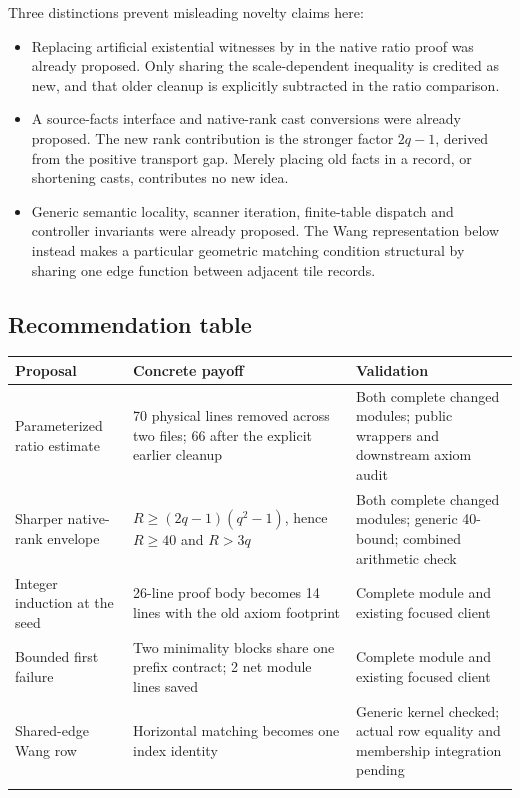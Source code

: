\documentclass[11pt,a4paper]{article}
\newcommand{\code}[1]{\texttt{\detokenize{#1}}}
\begin{document}
Three distinctions prevent misleading novelty claims here:
\begin{itemize}
\item Replacing artificial existential witnesses by \code{set} in the native ratio proof was already proposed. Only sharing the scale-dependent inequality is credited as new, and that older cleanup is explicitly subtracted in the ratio comparison.
\item A source-facts interface and native-rank cast conversions were already proposed. The new rank contribution is the stronger factor $2q-1$, derived from the positive transport gap. Merely placing old facts in a record, or shortening casts, contributes no new idea.
\item Generic semantic locality, scanner iteration, finite-table dispatch and controller invariants were already proposed. The Wang representation below instead makes a particular geometric matching condition structural by sharing one edge function between adjacent tile records.
\end{itemize}

\subsection{Recommendation table}

\begin{tabularx}{\textwidth}{@{}L{.21\textwidth}YL{.28\textwidth}@{}}
\toprule
\textbf{Proposal} & \textbf{Concrete payoff} & \textbf{Validation}\\
\midrule
Parameterized ratio estimate & 70 physical lines removed across two files; 66 after the explicit earlier \code{set} cleanup & Both complete changed modules; public wrappers and downstream axiom audit\\
\addlinespace[3pt]
Sharper native-rank envelope & $R\ge(2q-1)(q^2-1)$, hence $R\ge40$ and $R>3q$ & Both complete changed modules; generic 40-bound; combined arithmetic check\\
\addlinespace[3pt]
Integer induction at the seed & 26-line proof body becomes 14 lines with the old axiom footprint & Complete module and existing focused client\\
\addlinespace[3pt]
Bounded first failure & Two minimality blocks share one prefix contract; 2 net module lines saved & Complete module and existing focused client\\
\addlinespace[3pt]
Shared-edge Wang row & Horizontal matching becomes one index identity & Generic kernel checked; actual row equality and membership integration pending\\
\addlinespace[3pt]
\bottomrule
\end{tabularx}
\end{document}
